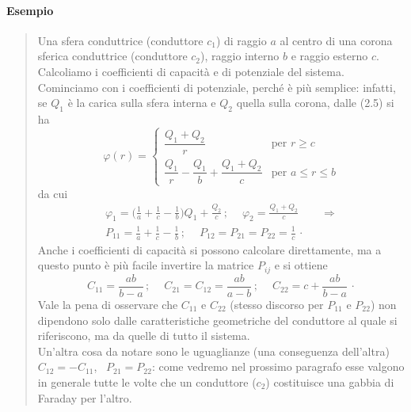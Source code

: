\paragraph{Esempio}
\begin{quote}
  Una sfera conduttrice (conduttore $c_1$) di raggio $a$ al centro di una corona
  sferica conduttrice (conduttore $c_2$), raggio interno $b$ e raggio esterno
  $c$. Calcoliamo i coefficienti di capacit\`a e di potenziale del sistema.\\
  Cominciamo con i coefficienti di potenziale, perch\'e \`e pi\`u semplice:
  infatti, se $Q_1$ \`e la carica sulla sfera interna e $Q_2$ quella sulla
  corona, dalle (2.5) si ha
  \begin{equation}
    \varphi(r)=\begin{cases}\dfrac{Q_1+Q_2}{r}&\text{per }r\ge c\\[10pt]
    \dfrac{Q_1}{r}-\dfrac{Q_1}{b}+\dfrac{Q_1+Q_2}{c}&\text{per }a\le r\le
    b\end{cases}
    \tag{2.14}
  \end{equation}
  da cui
  \begin{equation}
    \begin{gathered}
      \varphi_1=\Big(\frac1a+\frac1c-\frac1b\Big)Q_1+\frac{Q_2}{c}\,;
      \quad\ \varphi_2=\frac{Q_1+Q_2}{c}\qquad\Rightarrow\\
      P_{11}=\frac1a+\frac1c-\frac1b\,;
      \quad\ P_{12}=P_{21}=P_{22}=\frac1c\,\cdot
    \end{gathered}
    \tag{2.15}
  \end{equation}
  Anche i coefficienti di capacit\`a si possono calcolare direttamente, ma a
  questo punto \`e pi\`u facile invertire la matrice $P_{ij}$ e si ottiene
  \begin{equation}
    C_{11}=\frac{ab}{b-a}\,;
    \quad\ C_{21}=C_{12}=\frac{ab}{a-b}\,;\quad\ C_{22}=c+\frac{ab}{b-a}\,\cdot
    \tag{2.16}
  \end{equation}
  Vale la pena di osservare che $C_{11}$ e $C_{22}$ (stesso discorso per
  $P_{11}$ e $P_{22}$) non dipendono solo dalle caratteristiche geometriche del
  conduttore al quale si riferiscono, ma da quelle di tutto il sistema.\\
  Un'altra cosa da notare sono le uguaglianze (una conseguenza dell'altra)
  \ $C_{12}=-C_{11}$, \ $P_{21}=P_{22}$: come vedremo nel prossimo paragrafo
  esse valgono in generale tutte le volte che un conduttore ($c_2$) costituisce
  una gabbia di Faraday per l'altro.
\end{quote}

